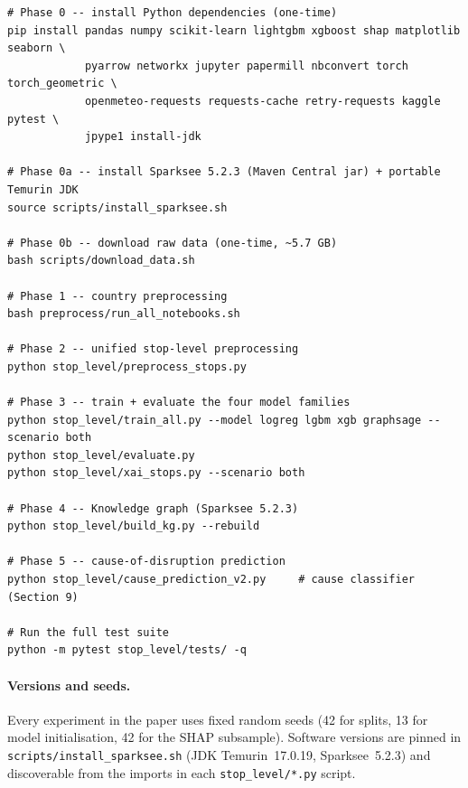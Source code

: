 \begin{verbatim}
# Phase 0 -- install Python dependencies (one-time)
pip install pandas numpy scikit-learn lightgbm xgboost shap matplotlib seaborn \
            pyarrow networkx jupyter papermill nbconvert torch torch_geometric \
            openmeteo-requests requests-cache retry-requests kaggle pytest \
            jpype1 install-jdk

# Phase 0a -- install Sparksee 5.2.3 (Maven Central jar) + portable Temurin JDK
source scripts/install_sparksee.sh

# Phase 0b -- download raw data (one-time, ~5.7 GB)
bash scripts/download_data.sh

# Phase 1 -- country preprocessing
bash preprocess/run_all_notebooks.sh

# Phase 2 -- unified stop-level preprocessing
python stop_level/preprocess_stops.py

# Phase 3 -- train + evaluate the four model families
python stop_level/train_all.py --model logreg lgbm xgb graphsage --scenario both
python stop_level/evaluate.py
python stop_level/xai_stops.py --scenario both

# Phase 4 -- Knowledge graph (Sparksee 5.2.3)
python stop_level/build_kg.py --rebuild

# Phase 5 -- cause-of-disruption prediction
python stop_level/cause_prediction_v2.py     # cause classifier (Section 9)

# Run the full test suite
python -m pytest stop_level/tests/ -q
\end{verbatim}

\paragraph{Versions and seeds.} Every experiment in the paper uses fixed random seeds (42 for splits, 13 for model initialisation, 42 for the SHAP subsample). Software versions are pinned in \texttt{scripts/install\_sparksee.sh} (JDK Temurin~17.0.19, Sparksee~5.2.3) and discoverable from the imports in each \texttt{stop\_level/*.py} script.
